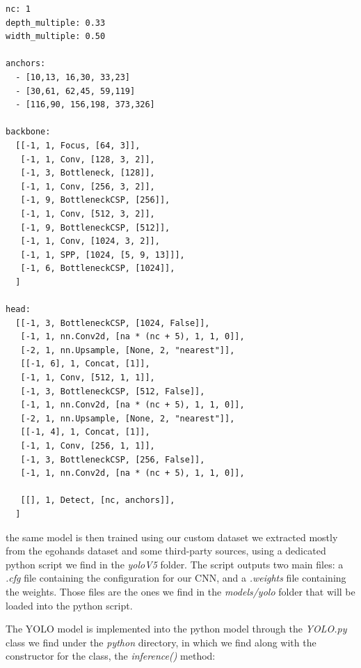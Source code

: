 \begin{lstlisting}[]
nc: 1
depth_multiple: 0.33
width_multiple: 0.50

anchors:
  - [10,13, 16,30, 33,23] 
  - [30,61, 62,45, 59,119]
  - [116,90, 156,198, 373,326] 

backbone:
  [[-1, 1, Focus, [64, 3]],
   [-1, 1, Conv, [128, 3, 2]],
   [-1, 3, Bottleneck, [128]],
   [-1, 1, Conv, [256, 3, 2]],
   [-1, 9, BottleneckCSP, [256]],
   [-1, 1, Conv, [512, 3, 2]], 
   [-1, 9, BottleneckCSP, [512]],
   [-1, 1, Conv, [1024, 3, 2]],
   [-1, 1, SPP, [1024, [5, 9, 13]]],
   [-1, 6, BottleneckCSP, [1024]],
  ]

head:
  [[-1, 3, BottleneckCSP, [1024, False]],
   [-1, 1, nn.Conv2d, [na * (nc + 5), 1, 1, 0]],
   [-2, 1, nn.Upsample, [None, 2, "nearest"]],
   [[-1, 6], 1, Concat, [1]],
   [-1, 1, Conv, [512, 1, 1]],
   [-1, 3, BottleneckCSP, [512, False]],
   [-1, 1, nn.Conv2d, [na * (nc + 5), 1, 1, 0]],
   [-2, 1, nn.Upsample, [None, 2, "nearest"]],
   [[-1, 4], 1, Concat, [1]],
   [-1, 1, Conv, [256, 1, 1]],
   [-1, 3, BottleneckCSP, [256, False]],
   [-1, 1, nn.Conv2d, [na * (nc + 5), 1, 1, 0]],

   [[], 1, Detect, [nc, anchors]],
  ]
\end{lstlisting}

the same model is then trained using our custom dataset we extracted mostly from the egohands dataset and some third-party sources, using a dedicated python script we find in the \textit{yoloV5} folder.
The script outputs two main files: a \textit{.cfg} file containing the configuration for our CNN, and a \textit{.weights} file containing the weights. Those files are the ones we find in the \textit{models/yolo} folder
that will be loaded into the python script. 

The YOLO model is implemented into the python model through the \textit{YOLO.py} class we find under the \textit{python} directory, in which we find along with the constructor for 
the class, the \textit{inference()} method:

